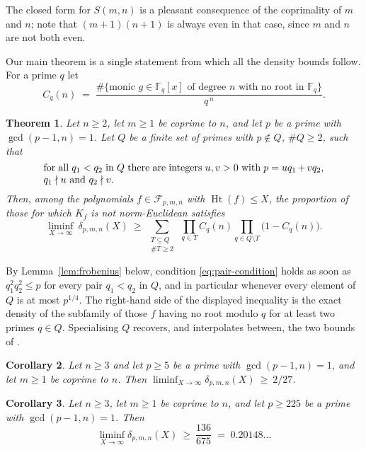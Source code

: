 \documentclass[11pt,reqno]{amsart}
\theoremstyle{plain}
\newtheorem{theorem}{Theorem}[section]
\newtheorem{corollary}[theorem]{Corollary}
\theoremstyle{definition}
\theoremstyle{remark}
\newcommand{\F}{\mathbb{F}}
\newcommand{\Ht}{\operatorname{Ht}}
\begin{document}
The closed form for $S(m,n)$ is a pleasant consequence of the coprimality of $m$ and $n$; note
that $(m+1)(n+1)$ is always even in that case, since $m$ and $n$ are not both even.

Our main theorem is a single statement from which all the density bounds follow. For a prime $q$
let
\[
  C_q(n)\;=\;\frac{\#\{\text{monic } g\in\F_q[x] \text{ of degree } n \text{ with no root in }\F_q\}}{q^{\,n}} .
\]

\begin{theorem}\label{thm:master}
Let $n\ge2$, let $m\ge1$ be coprime to $n$, and let $p$ be a prime with $\gcd(p-1,n)=1$. Let $Q$
be a finite set of primes with $p\notin Q$, $\#Q\ge2$, such that
\begin{equation}\label{eq:pair-condition}
  \parbox{0.82\textwidth}{for all $q_1<q_2$ in $Q$ there are integers $u,v>0$ with
  $p=uq_1+vq_2$, $q_1\nmid u$ and $q_2\nmid v$.}
\end{equation}
Then, among the polynomials $f\in\mathcal F_{p,m,n}$ with $\Ht(f)\le X$, the proportion of those
for which $K_f$ is not norm-Euclidean satisfies
\[
  \liminf_{X\to\infty}\ \delta_{p,m,n}(X)
  \ \ge\
  \sum_{\substack{T\subseteq Q\\ \#T\ge2}}\ \prod_{q\in T}C_q(n)\prod_{q\in Q\setminus T}\bigl(1-C_q(n)\bigr).
\]
\end{theorem}

By Lemma~\ref{lem:frobenius} below, condition \eqref{eq:pair-condition} holds as soon as
$q_1^2q_2^2\le p$ for every pair $q_1<q_2$ in $Q$, and in particular whenever every element of $Q$
is at most $p^{1/4}$. The right-hand side of the displayed inequality is the exact density of the
subfamily of those $f$ having no root modulo $q$ for at least two primes $q\in Q$. Specialising $Q$ recovers, and interpolates between, the two
bounds of \cite{HMT}.

\begin{corollary}\label{cor:227}
Let $n\ge3$ and let $p\ge5$ be a prime with $\gcd(p-1,n)=1$, and let $m\ge1$ be coprime to $n$.
Then $\liminf_{X\to\infty}\delta_{p,m,n}(X)\ \ge\ 2/27$.
\end{corollary}

\begin{corollary}\label{cor:235}
Let $n \ge 3$, let $m \ge 1$ be coprime to $n$, and let $p\ge225$ be a prime with
$\gcd(p-1,n)=1$. Then
\[
  \liminf_{X\to\infty}\delta_{p,m,n}(X)\ \ge\ \frac{136}{675}\;=\;0.20148\ldots
\]
\end{corollary}
\end{document}
